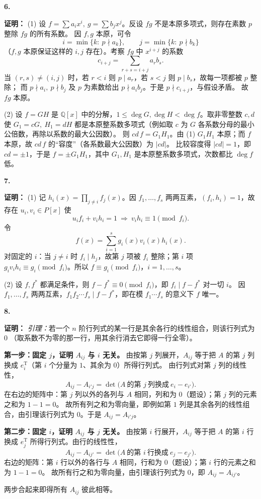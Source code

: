 \documentclass[11pt,a4paper,fontset=windows]{ctexart}
\newcommand{\sola}[2]{\Needspace{4\baselineskip}\par\vspace{10pt}%
  \noindent\textbf{#1}\hspace{0.45em}{\small\color{hdgray}\songti #2}\par\vspace{1pt}}
\newcommand{\pf}{\textbf{证明：}}
\begin{document}
\sola{6.}{（15 分）}\pf
(1) 设 $f=\sum a_ix^{i},\ g=\sum b_jx^{j}$。反设 $fg$ 不是本原多项式，则存在素数 $p$ 整除 $fg$ 的所有系数。
因 $f,g$ 本原，可令
\[
i=\min\{k:\ p\nmid a_k\},\qquad j=\min\{k:\ p\nmid b_k\}
\]
（$f,g$ 本原保证这样的 $i,j$ 存在）。考察 $fg$ 中 $x^{i+j}$ 的系数
\[
c_{i+j}=\sum_{r+s=i+j}a_rb_s .
\]
当 $(r,s)\neq(i,j)$ 时，若 $r<i$ 则 $p\mid a_r$，若 $s<j$ 则 $p\mid b_s$，故每一项都被 $p$ 整除；
而 $p\nmid a_i,\ p\nmid b_j$ 及 $p$ 为素数给出 $p\nmid a_ib_j$。于是 $p\nmid c_{i+j}$，与假设矛盾。
故 $fg$ 本原。
\par
(2) 设 $f=GH$ 是 $\mathbb{Q}[x]$ 中的分解，$1\le\deg G,\deg H<\deg f$。取非零整数 $c,d$ 使
$G_1=cG,\ H_1=dH$ 都是本原整系数多项式（例如取 $c$ 为 $G$ 各系数分母的最小公倍数，再除以系数的最大公因数）。
则 $cd\,f=G_1H_1$。由 (1) $G_1H_1$ 本原；而 $f$ 本原，故 $cd\,f$ 的“容度”（各系数最大公因数）为 $|cd|$。
比较容度得 $|cd|=1$，即 $cd=\pm1$，于是 $f=\pm G_1H_1$，其中 $G_1,H_1$ 是本原整系数多项式，次数都比 $\deg f$ 低。

\sola{7.}{（15 分）}\pf
(1) 记 $h_i(x)=\prod_{j\neq i}f_j(x)$。因 $f_1,\dots,f_s$ 两两互素，$(f_i,h_i)=1$，故存在
$u_i,v_i\in P[x]$ 使
\[
u_if_i+v_ih_i=1\ \Longrightarrow\ v_ih_i\equiv1\pmod{f_i}.
\]
令
\[
f(x)=\sum_{i=1}^{s}g_i(x)v_i(x)h_i(x).
\]
对固定的 $i$：当 $j\neq i$ 时 $f_i\mid h_j$，故第 $j$ 项被 $f_i$ 整除；第 $i$ 项
$g_iv_ih_i\equiv g_i\pmod{f_i}$。所以 $f\equiv g_i\pmod{f_i}$，$i=1,\dots,s$。
\par
(2) 设 $f,f^{*}$ 都满足条件，则 $f-f^{*}\equiv0\pmod{f_i}$，即 $f_i\mid f-f^{*}$ 对一切 $i$。
因 $f_1,\dots,f_s$ 两两互素，$f_1f_2\cdots f_s\mid f-f^{*}$，即在模 $f_1\cdots f_s$ 的意义下 $f$ 唯一。

\sola{8.}{（15 分）}\pf
\emph{引理：}若一个 $n$ 阶行列式的某一行是其余各行的线性组合，则该行列式为 $0$
（取系数不为零的那一行，用其余行消去它即得一行全零）。
\par
\textbf{第一步：固定 $j$，证明 $A_{ij}$ 与 $i$ 无关。}
由按第 $j$ 列展开，$A_{ij}$ 等于把 $A$ 的第 $j$ 列换成 $e_i^{\mathrm T}$（第 $i$ 个分量为 $1$、其余为 $0$）所得行列式。
由行列式对第 $j$ 列的线性性，
\[
A_{ij}-A_{i'j}=\det\bigl(A\ \text{的第 } j\ \text{列换成}\ e_i-e_{i'}\bigr).
\]
在右边的矩阵中：第 $j$ 列以外的各列与 $A$ 相同，列和为 $0$（题设）；第 $j$ 列的元素之和为 $1-1=0$。
故所有列之和为零向量，即例如第 $1$ 列是其余各列的线性组合，由引理该行列式为 $0$。于是 $A_{ij}=A_{i'j}$。
\par
\textbf{第二步：固定 $i$，证明 $A_{ij}$ 与 $j$ 无关。}
由按第 $i$ 行展开，$A_{ij}$ 等于把 $A$ 的第 $i$ 行换成 $e_j^{\mathrm T}$ 所得行列式。由行的线性性，
\[
A_{ij}-A_{ij'}=\det\bigl(A\ \text{的第 } i\ \text{行换成}\ e_j-e_{j'}\bigr).
\]
右边的矩阵：第 $i$ 行以外的各行与 $A$ 相同，行和为 $0$（题设）；第 $i$ 行的元素之和为 $1-1=0$。
故所有行之和为零向量，由引理该行列式为 $0$，即 $A_{ij}=A_{ij'}$。
\par
两步合起来即得所有 $A_{ij}$ 彼此相等。
\end{document}
